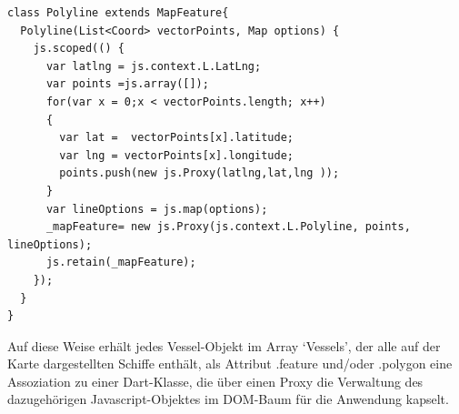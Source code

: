 \begin{lstlisting}[caption= Konstructor des Dart-Objekts Polyline, label = Constructor Polyline]
class Polyline extends MapFeature{
  Polyline(List<Coord> vectorPoints, Map options) {
    js.scoped(() {
      var latlng = js.context.L.LatLng;
      var points =js.array([]);
      for(var x = 0;x < vectorPoints.length; x++)
      {
        var lat =  vectorPoints[x].latitude;
        var lng = vectorPoints[x].longitude;
        points.push(new js.Proxy(latlng,lat,lng ));
      }
      var lineOptions = js.map(options);
      _mapFeature= new js.Proxy(js.context.L.Polyline, points, lineOptions);
      js.retain(_mapFeature);
    });
  }
}
\end{lstlisting}
Auf diese Weise erhält jedes Vessel-Objekt im Array ‘Vessels’, der alle auf der Karte dargestellten Schiffe enthält, als Attribut .feature und/oder .polygon eine Assoziation zu einer Dart-Klasse, die über einen Proxy die Verwaltung des dazugehörigen Javascript-Objektes im DOM-Baum für die Anwendung kapselt.\\

